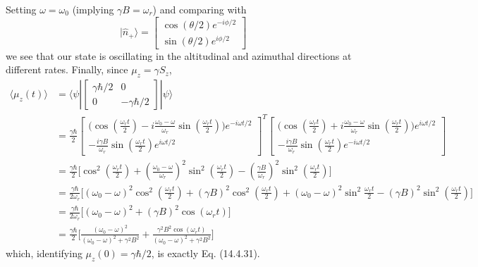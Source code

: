 \documentclass[../principles-of-quantum-mechanics.tex]{subfiles}
\begin{document}
\begin{questions}
\begin{solution}
			Setting $\omega = \omega_0$ (implying $\gamma B = \omega_r$) and comparing with
			$$|\hat{n}_+\rangle = \begin{bmatrix}
				\cos(\theta/2)e^{-i\phi/2} \\
				\sin(\theta/2)e^{i\phi/2}
			\end{bmatrix}$$
			we see that our state is oscillating in the altitudinal and azimuthal directions at different rates. Finally, since $\mu_z = \gamma S_z$,
			\begin{align*}
				\langle\mu_z(t)\rangle &= \langle\psi|\begin{bmatrix}\gamma\hbar/2 & 0 \\ 0 & -\gamma\hbar/2\end{bmatrix}|\psi\rangle \\
				&= \frac{\gamma\hbar}{2}\begin{bmatrix}\big(\cos(\frac{\omega_rt}{2}) - i\frac{\omega_0 - \omega}{\omega_r}\sin(\frac{\omega_rt}{2})\big)e^{-i\omega t/2} \\ -\frac{i\gamma B}{\omega_r}\sin(\frac{\omega_rt}{2})e^{i\omega t/2}\end{bmatrix}^T\begin{bmatrix}\big(\cos(\frac{\omega_rt}{2}) + i\frac{\omega_0 - \omega}{\omega_r}\sin(\frac{\omega_rt}{2})\big)e^{i\omega t/2} \\ -\frac{i\gamma B}{\omega_r}\sin(\frac{\omega_rt}{2})e^{-i\omega t/2}\end{bmatrix} \\
				&= \frac{\gamma\hbar}{2}\Big[\cos^2(\tfrac{\omega_rt}{2}) + (\tfrac{\omega_0-\omega}{\omega_r})^2\sin^2(\tfrac{\omega_rt}{2}) - (\tfrac{\gamma B}{\omega_r})^2\sin^2(\tfrac{\omega_rt}{2})\Big] \\
				&= \frac{\gamma\hbar}{2\omega_r}\Big[(\omega_0 - \omega)^2\cos^2(\tfrac{\omega_rt}{2}) + (\gamma B)^2\cos^2(\tfrac{\omega_rt}{2}) + (\omega_0-\omega)^2\sin^2\tfrac{\omega_rt}{2} - (\gamma B)^2\sin^2(\tfrac{\omega_rt}{2})\Big] \\
				&= \frac{\gamma\hbar}{2\omega_r}\Big[(\omega_0-\omega)^2 + (\gamma B)^2\cos(\omega_rt)\Big] \\
				&= \frac{\gamma\hbar}{2}\Big[\frac{(\omega_0-\omega)^2}{(\omega_0-\omega)^2 + \gamma^2B^2} + \frac{\gamma^2B^2\cos(\omega_rt)}{(\omega_0-\omega)^2 + \gamma^2B^2}\Big]
			\end{align*}
			which, identifying $\mu_z(0) = \gamma\hbar/2$, is exactly Eq. (14.4.31).
		\end{solution}
		

\end{questions}
\end{document}
